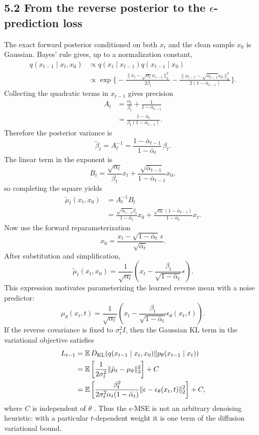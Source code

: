 \documentclass[11pt]{article}
\newcommand{\E}{\mathbb{E}}
\begin{document}
\subsection*{5.2 From the reverse posterior to the $\epsilon$-prediction loss}

The exact forward posterior conditioned on both $x_t$ and the clean sample
$x_0$ is Gaussian. Bayes' rule gives, up to a normalization constant,
\begin{align*}
 q(x_{t-1}\mid x_t,x_0)
 &\propto q(x_t\mid x_{t-1})q(x_{t-1}\mid x_0)\\
 &\propto
 \exp\Bigg\{-\frac{\|x_t-\sqrt{\alpha_t}x_{t-1}\|_2^2}{2\beta_t}
 -\frac{\|x_{t-1}-\sqrt{\bar\alpha_{t-1}}x_0\|_2^2}
 {2(1-\bar\alpha_{t-1})}\Bigg\}.
\end{align*}
Collecting the quadratic terms in $x_{t-1}$ gives precision
\begin{align*}
 A_t
 &=\frac{\alpha_t}{\beta_t}
   +\frac{1}{1-\bar\alpha_{t-1}}\\
 &=\frac{1-\bar\alpha_t}
 {\beta_t(1-\bar\alpha_{t-1})}.
\end{align*}
Therefore the posterior variance is
\[
 \boxed{
 \tilde\beta_t=A_t^{-1}
 =\frac{1-\bar\alpha_{t-1}}{1-\bar\alpha_t}\,\beta_t
 }.
\]
The linear term in the exponent is
\[
 B_t=\frac{\sqrt{\alpha_t}}{\beta_t}x_t
 +\frac{\sqrt{\bar\alpha_{t-1}}}{1-\bar\alpha_{t-1}}x_0,
\]
so completing the square yields
\begin{align*}
 \tilde\mu_t(x_t,x_0)
 &=A_t^{-1}B_t\\
 &=\frac{\sqrt{\bar\alpha_{t-1}}\beta_t}{1-\bar\alpha_t}x_0
 +\frac{\sqrt{\alpha_t}(1-\bar\alpha_{t-1})}{1-\bar\alpha_t}x_t.
\end{align*}
Now use the forward reparameterization
\[
 x_0=\frac{x_t-\sqrt{1-\bar\alpha_t}\,\epsilon}
 {\sqrt{\bar\alpha_t}}.
\]
After substitution and simplification,
\[
 \boxed{
 \tilde\mu_t(x_t,x_0)
 =\frac{1}{\sqrt{\alpha_t}}
 \left(x_t-
 \frac{\beta_t}{\sqrt{1-\bar\alpha_t}}\epsilon\right)
 }.
\]
This expression motivates parameterizing the learned reverse mean with a noise
predictor:
\[
 \mu_\theta(x_t,t)
 =\frac{1}{\sqrt{\alpha_t}}
 \left(x_t-
 \frac{\beta_t}{\sqrt{1-\bar\alpha_t}}
 \epsilon_\theta(x_t,t)\right).
\]
If the reverse covariance is fixed to $\sigma_t^2I$, then the Gaussian KL term
in the variational objective satisfies
\begin{align*}
 L_{t-1}
 &=\E\,D_{\rm KL}\!\left(
 q(x_{t-1}\mid x_t,x_0)\Vert p_\theta(x_{t-1}\mid x_t)
 \right)\\
 &=\E\left[
 \frac{1}{2\sigma_t^2}
 \|\tilde\mu_t-\mu_\theta\|_2^2\right]+C\\
 &=\E\left[
 \frac{\beta_t^2}
 {2\sigma_t^2\alpha_t(1-\bar\alpha_t)}
 \|\epsilon-\epsilon_\theta(x_t,t)\|_2^2\right]+C,
\end{align*}
where $C$ is independent of $\theta$ \cite{ho2020ddpm}. Thus the
$\epsilon$-MSE is not an arbitrary denoising heuristic: with a particular
$t$-dependent weight it is one term of the diffusion variational bound.
\end{document}
